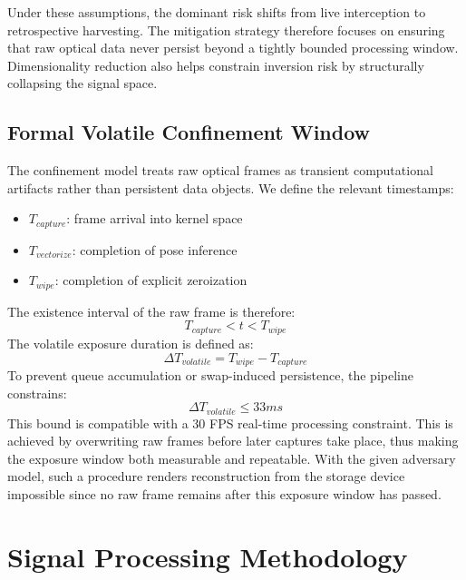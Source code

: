 \documentclass[conference]{IEEEtran}
\begin{document}
Under these assumptions, the dominant risk shifts from live interception to retrospective harvesting. The mitigation strategy therefore focuses on ensuring that raw optical data never persist beyond a tightly bounded processing window. Dimensionality reduction also helps constrain inversion risk by structurally collapsing the signal space.


\subsection{Formal Volatile Confinement Window}
The confinement model treats raw optical frames as transient computational artifacts rather than persistent data objects. We define the relevant timestamps:
\begin{itemize}
    \item $T_{capture}$: frame arrival into kernel space
    \item $T_{vectorize}$: completion of pose inference
    \item $T_{wipe}$: completion of explicit zeroization
\end{itemize}

The existence interval of the raw frame is therefore:
\begin{equation}
T_{capture} < t < T_{wipe}
\end{equation}
The volatile exposure duration is defined as:
\begin{equation}
\Delta T_{volatile} = T_{wipe} - T_{capture}
\end{equation}
To prevent queue accumulation or swap-induced persistence, the pipeline constrains:
\begin{equation}
\Delta T_{volatile} \le 33ms
\end{equation}
This bound is compatible with a 30 FPS real-time processing constraint. This is achieved by overwriting raw frames before later captures take place, thus making the exposure window both measurable and repeatable. With the given adversary model, such a procedure renders reconstruction from the storage device impossible since no raw frame remains after this exposure window has passed.

\section{Signal Processing Methodology}
\end{document}
